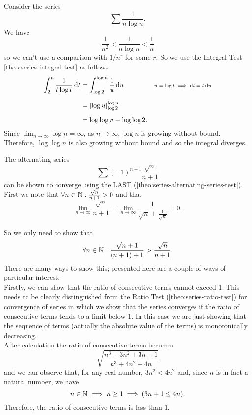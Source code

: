 \documentclass[../MathsNotesBase.tex]{subfiles}
\begin{document}
{\begin{exe}
			\biggerskip
			\ex Consider the series
				\[ \sum \frac{1}{n\log{n}}. \]
				We have
				\[ \frac{1}{n^2} < \frac{1}{n\log{n}} < \frac{1}{n} \]
				so we can't use a comparison with ${ 1/n^r }$ for some $r$. So we use the Integral Test \autoref{theo:series-integral-test} as follows.				
				\[\begin{aligned}
					\int_2^n \frac{1}{t\log{t}} \dif t &= \int_{\log{2}}^{\log{n}} \frac{1}{u} \dif u &\sidecomment{${ u = \log{t} \implies \dif t = t \dif u }$} \nn
					&= [\log{u}]_{\log{2}}^{\log{n}} \nn
					&= \log{\log{n}} - \log{\log{2}}.
				\end{aligned}\]
				Since ${ \lim_{n \to \infty} \log{n} = \infty }$, as ${ n \to \infty }$, $\log{n}$ is growing without bound. Therefore, ${ \log{\log{n}} }$ is also growing without bound and so the integral diverges.
				
			\biggerskip
			\ex The alternating series
			\[ \sum (-1)^{n+1} \frac{\sqrt{n}}{n + 1} \]
			can be shown to converge using the LAST (\autoref{theo:series-alternating-series-test}).\\
			
			First we note that ${ \forall n \in \mathbb{N}^{} \;.\; \frac{\sqrt{n}}{n + 1} > 0 }$ and that
			\[ \lim_{n \to \infty} \frac{\sqrt{n}}{n + 1} = \lim_{n \to \infty} \frac{1}{\sqrt{n} + \frac{1}{\sqrt{n}}} = 0. \]
			
			So we only need to show that
			\[ \forall n \in \mathbb{N}^{} \;.\; \frac{\sqrt{n + 1}}{(n + 1) + 1} > \frac{\sqrt{n}}{n + 1}. \]
			There are many ways to show this; presented here are a couple of ways of particular interest.\\
			
			Firstly, we can show that the ratio of consecutive terms cannot exceed 1. This needs to be clearly distinguished from the Ratio Test (\autoref{theo:series-ratio-test}) for convergence of series in which we show that the series converges if the ratio of consecutive terms tends to a limit below 1. In this case we are just showing that the sequence of terms (actually the absolute value of the terms) is monotonically decreasing.\\
			
			After calculation the ratio of consecutive terms becomes
			\[ \sqrt{\frac{n^3 + 3n^2 + 3n + 1}{n^3 + 4n^2 + 4n}} \]
			and we can observe that, for any real number, ${ 3n^2 < 4n^2 }$ and, since $n$ is in fact a natural number, we have			
			\[ n \in \mathbb{N}^{} \implies n \geq 1 \implies (3n + 1 \leq 4n). \]
			Therefore, the ratio of consecutive terms is less than 1.\\
			

\end{exe}}
\end{document}
